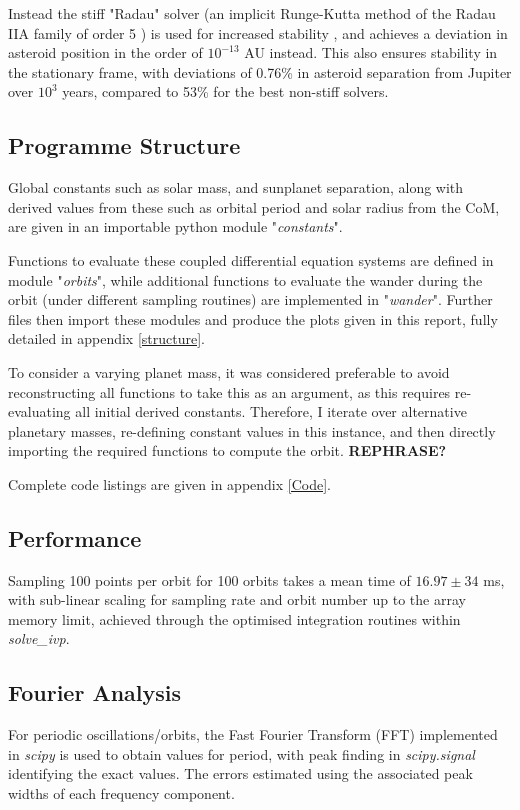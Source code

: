 \documentclass[11pt, a4paper,twocolumn]{article} %
\begin{document}
Instead the stiff "Radau" solver (an implicit Runge-Kutta method of the Radau IIA family of order 5 \cite{Hairer2010}) is used for increased stability \cite{Frank1985}, and achieves a deviation in asteroid position in the order of $ 10^{-13}$ AU instead. This also ensures stability in the stationary frame, with deviations of 0.76\% in asteroid separation from Jupiter over $ 10^{3} $ years, compared to 53\% for the best non-stiff solvers.


\subsection{Programme Structure}
Global constants such as solar mass, and sun\textendash planet separation, along with derived values from these such as orbital period and solar radius from the CoM, are given in an importable python module "\textit{constants}".

Functions to evaluate these coupled differential equation systems are defined in module "\textit{orbits}", while additional functions to evaluate the wander during the orbit (under different sampling routines) are implemented in "\textit{wander}". Further files then import these modules and produce the plots given in this report, fully detailed in appendix \ref{structure}.

To consider a varying planet mass, it was considered preferable to avoid reconstructing all functions to take this as an argument, as this requires re-evaluating all initial derived constants. Therefore, I iterate over alternative planetary masses, re-defining constant values in this instance, and then directly importing the required functions to compute the orbit. \textbf{REPHRASE?}

Complete code listings are given in appendix \ref{Code}.


\subsection{Performance} \label{Performance}
Sampling 100 points per orbit for 100 orbits takes a mean time of $16.97 \pm 34$ \si{\milli\second}, with sub-linear scaling for sampling rate and orbit number up to the array memory limit, achieved through the optimised integration routines within \textit{solve\_ivp}.

\subsection{Fourier Analysis} \label{Fourier}
For periodic oscillations/orbits, the Fast Fourier Transform (FFT) implemented in \textit{scipy} is used to obtain values for period, with peak finding in \textit{scipy.signal} identifying the exact values. The errors estimated using the associated peak widths of each frequency component.
\end{document}
